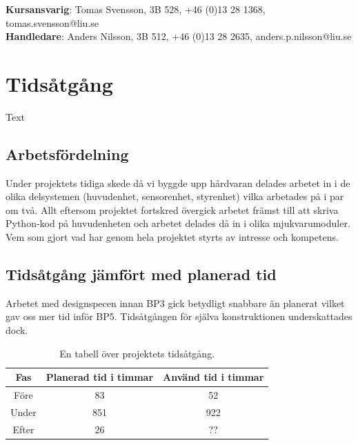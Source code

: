 ﻿\documentclass{article}
\begin{document}
\begin{center}
\textbf{Kursansvarig}: Tomas Svensson, 3B 528, +46 (0)13 28 1368, tomas.svensson@liu.se \\
\textbf{Handledare}: Anders Nilsson, 3B 512, +46 (0)13 28 2635, anders.p.nilsson@liu.se
\end{center}
\vspace*{\fill}
\clearpage

\renewcommand*\contentsname{Innehållsförteckning}
\tableofcontents

\clearpage
\section{Tidsåtgång}
Text


\subsection{Arbetsfördelning}
Under projektets tidiga skede då vi byggde upp hårdvaran delades arbetet in i de olika delsystemen (huvudenhet, sensorenhet, styrenhet) vilka arbetades på i par om två. Allt eftersom projektet fortskred övergick arbetet främst till att skriva Python-kod på huvudenheten och arbetet delades då in i olika mjukvarumoduler. Vem som gjort vad har genom hela projektet styrts av intresse och kompetens.


\subsection{Tidsåtgång jämfört med planerad tid}
Arbetet med designspecen innan BP3 gick betydligt snabbare än planerat vilket gav oss mer tid inför BP5. Tidsåtgången för själva konstruktionen underskattades dock.

\begin{table}[H]
\centering
\caption{En tabell över projektets tidsåtgång.}
\begin{tabular}{ | c | c | c | }
\hline
Fas & Planerad tid i timmar & Använd tid i timmar \\
\hline
Före & 83 & 52 \\
\hline
Under & 851 & 922 \\
\hline
Efter & 26 & ?? \\
\hline
\end{tabular}
\label{table:tidsatgang}
\end{table}
\ \\


\clearpage
\end{document}
